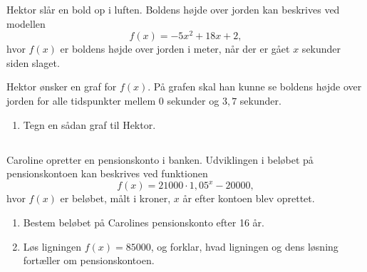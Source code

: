 \documentclass[10pt,a4paper,table]{article}
\begin{document}
Hektor slår en bold op i luften. Boldens højde over jorden kan beskrives ved modellen
\[
    f(x) = -5x^{2} + 18x + 2,
\]
hvor $f(x)$ er boldens højde over jorden i meter, når der er gået $x$ sekunder siden slaget.

Hektor ønsker en graf for $f(x)$. På grafen skal han kunne se boldens højde over jorden for alle tidspunkter mellem $0$ sekunder og $3{,}7$ sekunder.

\begin{enumerate}
    \item Tegn en sådan graf til Hektor.
\end{enumerate}

\subsection{}
Caroline opretter en pensionskonto i banken. 
Udviklingen i beløbet på pensionskontoen kan beskrives ved funktionen
\[
    f(x) = 21000 \cdot 1{,}05^x - 20000,
\]
hvor $f(x)$ er beløbet, målt i kroner, $x$ år efter kontoen blev oprettet.

\begin{enumerate}
    \item Bestem beløbet på Carolines pensionskonto efter 16 år.
    \item Løs ligningen $f(x) = 85000$, og forklar, hvad ligningen og dens løsning fortæller om pensionskontoen.
\end{enumerate}
\end{document}
